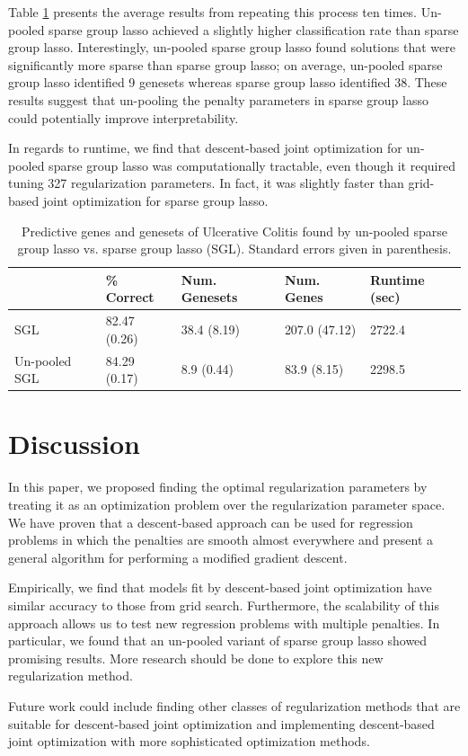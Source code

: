 \documentclass{statsoc}
\begin{document}
Table \ref{colitis} presents the average results from repeating this process ten times. Un-pooled sparse group lasso achieved a slightly higher classification rate than sparse group lasso. Interestingly, un-pooled sparse group lasso found solutions that were significantly more sparse than sparse group lasso; on average, un-pooled sparse group lasso identified 9 genesets whereas sparse group lasso identified 38. These results suggest that un-pooling the penalty parameters in sparse group lasso could potentially improve interpretability.

In regards to runtime, we find that descent-based joint optimization for un-pooled sparse group lasso was computationally tractable, even though it required tuning 327 regularization parameters. In fact, it was slightly faster than grid-based joint optimization for sparse group lasso.

\begin{table}
\caption{\label{colitis} Predictive genes and genesets of Ulcerative Colitis found by un-pooled sparse group lasso vs. sparse group lasso (SGL). Standard errors given in parenthesis.}
\centering
\begin{tabular}{| l | l | l | l | l | }
\hline
 & \% Correct  & Num. Genesets & Num. Genes & Runtime (sec) \\
\hline
SGL & 82.47 (0.26) & 38.4 (8.19) & 207.0 (47.12) & 2722.4 \\
\hline
Un-pooled SGL & 84.29 (0.17) & 8.9 (0.44) & 83.9 (8.15) & 2298.5 \\
\hline
\end{tabular}
\end{table}

\section{Discussion}
In this paper, we proposed finding the optimal regularization parameters by treating it as an optimization problem over the regularization parameter space. We have proven that a descent-based approach can be used for regression problems in which the penalties are smooth almost everywhere and present a general algorithm for performing a modified gradient descent.

Empirically, we find that models fit by descent-based joint optimization have similar accuracy to those from grid search. Furthermore, the scalability of this approach allows us to test new regression problems with multiple penalties. In particular, we found that an un-pooled variant of sparse group lasso showed promising results. More research should be done to explore this new regularization method.

Future work could include finding other classes of regularization methods that are suitable for descent-based joint optimization and implementing descent-based joint optimization with more sophisticated optimization methods.

\bigskip


\end{document}
